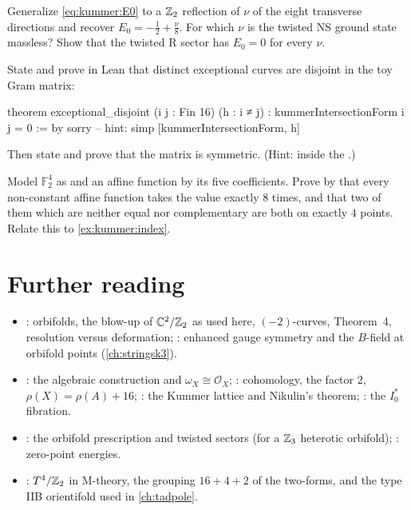 \begin{exercise}\label{exr:kummer:E0}
Generalize \eqref{eq:kummer:E0} to a $\mathbb{Z}_2$ reflection of $\nu$ of the eight transverse
directions and recover $E_0=-\frac12+\frac\nu8$. For which $\nu$ is the twisted NS ground
state massless? Show that the twisted R sector has $E_0=0$ for every $\nu$.
\end{exercise}

\begin{exercise}\label{exr:kummer:leanoff}
State and prove in Lean that distinct exceptional curves are disjoint in the toy Gram matrix:
\begin{leancode}
theorem exceptional_disjoint (i j : Fin 16) (h : i ≠ j) :
    kummerIntersectionForm i j = 0 := by
  sorry  -- hint: simp [kummerIntersectionForm, h]
\end{leancode}
Then state and prove that the matrix is symmetric. (Hint:  inside the
.)
\end{exercise}

\begin{exercise}
\label{exr:kummer:leancode}
Model $\mathbb{F}_2^4$ as  and an affine function by its five
coefficients. Prove by  that every non-constant affine function takes the value
 exactly $8$ times, and that two of them which are neither equal nor
complementary are both  on exactly $4$ points. Relate this to
\cref{ex:kummer:index}.
\end{exercise}

\section*{Further reading}
\begin{itemize}[leftmargin=*,itemsep=1pt]
\item {}: orbifolds, the blow-up of
$\mathbb{C}^2/\mathbb{Z}_2$ as used here, $(-2)$-curves, Theorem~4, resolution versus deformation;
: enhanced gauge symmetry and the $B$-field
at orbifold points (\cref{ch:stringsk3}).
\item {}: the algebraic construction and
$\omega_X\cong\mathcal{O}_X$; : cohomology, the factor $2$,
$\rho(X)=\rho(A)+16$; : the Kummer lattice and Nikulin's
theorem; : the $I_0^*$ fibration.
\item {}: the orbifold prescription and
twisted sectors (for a $\mathbb{Z}_3$ heterotic orbifold); : zero-point energies.
\item {}: $T^4/\mathbb{Z}_2$ in M-theory, the grouping $16+4+2$ of the
two-forms, and the type IIB orientifold used in \cref{ch:tadpole}.
\end{itemize}
